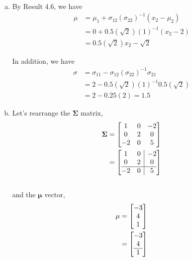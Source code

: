 \documentclass[12pt]{article}\usepackage[]{graphicx}\usepackage[]{color}
\newcommand{\vct}{\mathbf}
\begin{document}
\begin{enumerate}[a)]

\item By Result 4.6, we have 
\begin{align*}
\mu &= \mu_1 + \sigma_{12}(\sigma_{22})^{-1}(x_2 - \mu_2)\\
&= 0 + 0.5(\sqrt{2})(1)^{-1}(x_2 - 2)\\
&= 0.5(\sqrt{2})x_2 - \sqrt{2}
\end{align*}

In addition, we have 
\begin{align*}
\sigma &= \sigma_{11} - \sigma_{12}(\sigma_{22})^{-1}\sigma_{21}\\
&= 2 - 0.5(\sqrt{2})(1)^{-1}0.5(\sqrt{2})\\
&= 2 - 0.25(2) = 1.5
\end{align*}

\item Let's rearrange the $\vct{\Sigma}$ matrix,
\begin{align*}
\vct{\Sigma} &= \begin{bmatrix} 1 & 0 & -2 \\
                    0 & 2 & 0 \\
                    -2 & 0 & 5
    \end{bmatrix}\\
&= \left[\begin{array}{@{}cc|c@{}}
    1 & 0 & -2 \\
    0 & 2 & 0 \\\hline
    -2 & 0 & 5
  \end{array}\right]
\end{align*}\\

and the $\vct{\mu}$ vector,
\begin{align*}
\vct{\mu} &= \begin{bmatrix} -3 \\ 4 \\ 1 \end{bmatrix}\\
&= \left[\begin{array}{@{}c@{}}
    -3 \\
    4 \\\hline
    1
  \end{array}\right]
\end{align*}


\end{enumerate}
\end{document}
